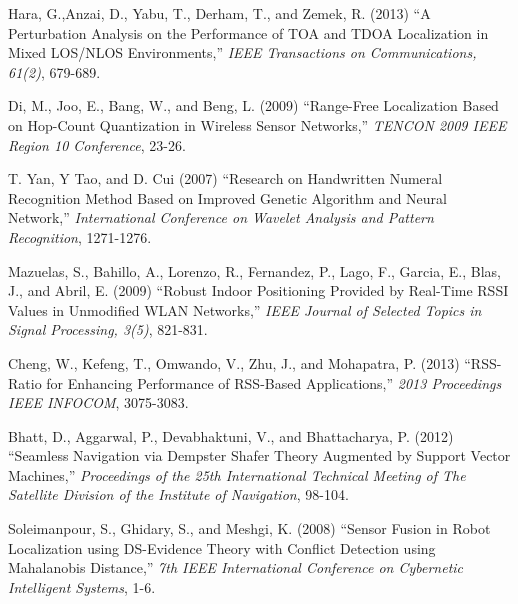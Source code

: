 \documentclass[12pt]{uthesis-v12}  %
\begin{document}
\begin{thebibliography}{00}
 Hara, G.,Anzai, D., Yabu, T., Derham, T., and Zemek, R. (2013) ``A Perturbation Analysis on the Performance of TOA and TDOA Localization in Mixed LOS/NLOS Environments,'' {\it IEEE Transactions on Communications, 61(2)}, 679-689.



Di, M., Joo, E., Bang, W., and Beng, L. (2009) ``Range-Free Localization Based on Hop-Count Quantization in Wireless Sensor Networks,'' {\it TENCON 2009 IEEE Region 10 Conference}, 23-26.

T. Yan, Y Tao, and D. Cui (2007) ``Research on Handwritten Numeral Recognition Method Based on Improved Genetic Algorithm and Neural Network,'' {\it International Conference on Wavelet Analysis and Pattern Recognition}, 1271-1276.

Mazuelas, S., Bahillo, A., Lorenzo, R., Fernandez, P., Lago, F., Garcia, E., Blas, J., and Abril, E. (2009) ``Robust Indoor Positioning Provided by Real-Time RSSI Values in Unmodified WLAN Networks,'' {\it IEEE Journal of Selected Topics in Signal Processing, 3(5)}, 821-831.

 Cheng, W., Kefeng, T., Omwando, V., Zhu, J., and Mohapatra, P. (2013) ``RSS-Ratio for Enhancing Performance of RSS-Based Applications,'' {\it 2013 Proceedings IEEE INFOCOM}, 3075-3083.


Bhatt, D., Aggarwal, P., Devabhaktuni, V., and Bhattacharya, P. (2012) ``Seamless Navigation via Dempster Shafer Theory Augmented by Support Vector Machines,'' {\it Proceedings of the 25th International Technical Meeting of The Satellite Division of the Institute of Navigation}, 98-104.

Soleimanpour, S., Ghidary, S., and Meshgi, K. (2008) ``Sensor Fusion in Robot Localization using DS-Evidence Theory with Conflict Detection using Mahalanobis Distance,'' {\it 7th IEEE International Conference on Cybernetic Intelligent Systems}, 1-6.


\end{thebibliography}
\end{document}
